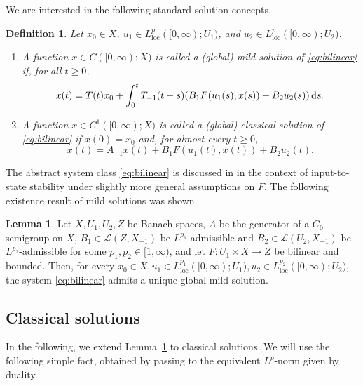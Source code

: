 \documentclass{cocv}
\newcommand{\ds}{ {\, \rm d} s}
\DeclareMathOperator{\loc}{loc}
\newtheorem{definition}{Definition}
\theoremstyle{definition}
\newtheorem{lemma}{Lemma}
\begin{document}
We are interested in the following standard solution concepts.

\begin{definition}
    Let $x_0 \in X$, $u_1 \in L_{\loc}^p([0, \infty); U_1)$, and $u_2 \in L_{\loc}^p([0, \infty); U_2)$.
    \begin{enumerate}[\rm (i)]
        \item A function $x \in C([0,\infty);X)$ is called a \emph{(global) mild solution of \eqref{eq:bilinear}} if, for all $t \geq 0$,
    \begin{equation*}
         x(t) = T(t)x_0 + \int_{0}^{t} T_{-1}(t - s)(B_1F(u_1(s),x(s)) + B_2u_2(s)) \ds.
    \end{equation*}

    \item A function $x\in C^1([0,\infty);X)$ is called a \emph{(global) classical solution of \eqref{eq:bilinear}} if $x(0)=x_0$ and, for almost every $t \geq 0$,
    \begin{equation}\label{eq:extrapolated_bilinear}
         \dot x(t) = A_{-1}x(t) + B_1F(u_1(t),x(t)) + B_2u_2(t).
    \end{equation}
    \end{enumerate}
\end{definition}


The abstract system class \eqref{eq:bilinear} is discussed in
\cite{MR4440806} in the context of input-to-state stability under slightly more general assumptions on $F$. The following existence result of mild solutions was shown.

\begin{lemma}{\cite[Lem.~2.8~\&~Rem.~2.10]{MR4440806}}\label{lm:bilinear_mild}
Let $X, U_1, U_2, Z$ be Banach spaces, $A$ be the generator of a $C_0$-semigroup on $X$, $B_1 \in \mathcal L(Z,X_{-1})$ be $L^{p_1}$-admissible and $B_2 \in \mathcal L(U_2, X_{-1})$ be $L^{p_2}$-admissible for some $p_1, p_2\in[1,\infty)$, and let $F\colon U_1 \times X \to Z$ be bilinear and bounded. Then, for every $x_0 \in X, u_1\in L^{p_1}_{\loc}([0, \infty);U_1), u_2 \in L^{p_2}_{\loc}([0, \infty);U_2)$, the system \eqref{eq:bilinear} admits a unique global mild solution.
\end{lemma}



\subsection{Classical solutions}

In the following, we extend Lemma~\ref{lm:bilinear_mild} to classical solutions. We will use the following simple fact, obtained by passing to the equivalent $L^p$-norm given by duality.
\end{document}
